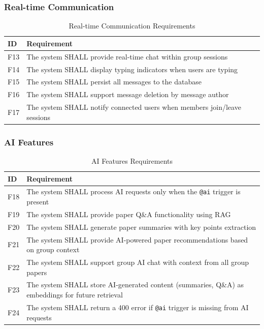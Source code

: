\documentclass[11pt,a4paper]{article}
\begin{document}
\subsubsection{Real-time Communication}

\begin{table}[H]
\centering
\begin{tabular}{p{1.5cm}p{11.5cm}}
\toprule
\textbf{ID} & \textbf{Requirement} \\
\midrule
F13 & The system SHALL provide real-time chat within group sessions \\
F14 & The system SHALL display typing indicators when users are typing \\
F15 & The system SHALL persist all messages to the database \\
F16 & The system SHALL support message deletion by message author \\
F17 & The system SHALL notify connected users when members join/leave sessions \\
\bottomrule
\end{tabular}
\caption{Real-time Communication Requirements}
\end{table}

\subsubsection{AI Features}

\begin{table}[H]
\centering
\begin{tabular}{p{1.5cm}p{11.5cm}}
\toprule
\textbf{ID} & \textbf{Requirement} \\
\midrule
F18 & The system SHALL process AI requests only when the \texttt{@ai} trigger is present \\
F19 & The system SHALL provide paper Q\&A functionality using RAG \\
F20 & The system SHALL generate paper summaries with key points extraction \\
F21 & The system SHALL provide AI-powered paper recommendations based on group context \\
F22 & The system SHALL support group AI chat with context from all group papers \\
F23 & The system SHALL store AI-generated content (summaries, Q\&A) as embeddings for future retrieval \\
F24 & The system SHALL return a 400 error if \texttt{@ai} trigger is missing from AI requests \\
\bottomrule
\end{tabular}
\caption{AI Features Requirements}
\end{table}
\end{document}
